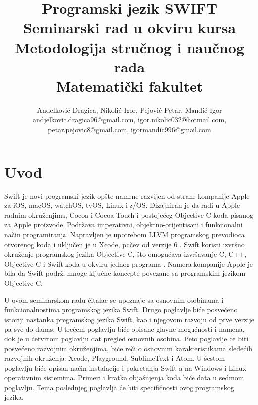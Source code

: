 \documentclass[a4paper]{article}
\begin{document}
\title{Programski jezik SWIFT\\ \small{Seminarski rad u okviru kursa\\Metodologija stručnog i naučnog rada\\ Matematički fakultet}}

\author{Anđelković Dragica, Nikolić Igor, Pejović Petar, Mandić Igor\\ andjelkovic.dragica96@gmail.com, igor.nikolic032@hotmail.com,\\ petar.pejovic8@gmail.com, igormandic996@gmail.com}


\maketitle



\tableofcontents

\newpage

\section{Uvod}
\label{sec:uvod}
Swift je novi programski jezik opšte namene razvijen od strane kompanije Apple za iOS, macOS, watchOS, tvOS, Linux i z/OS. Dizajniran je da radi u Apple radnim okruženjima, Cocoa i Cocoa Touch i postojećeg Objective-C koda pisanog za Apple proizvode. Podržava imperativni, objektno-orijentisani i funkcionalni način programiranja. Napravljen je upotrebom LLVM programskog prevodioca otvorenog koda i uključen je u Xcode, počev od verzije 6 \cite{swift_sajt}. Swift koristi izvršno okruženje programskog jezika Objective-C, što omogućava izvršavanje C, C++, Objective-C i Swift koda u okviru jednog programa \cite{arc_sajt}.
Namera kompanije Apple je bila da Swift podrži mnoge ključne koncepte povezane sa programskim jezikom Objective-C.

 U ovom seminarskom radu čitalac se upoznaje sa osnovnim osobinama i funkcionalnostima programskog jezika Swift. Drugo poglavlje biće posvećeno istoriji nastanka programskog jezika Swift, kao i njegovom razvoju od prve verzije pa sve do danas. U trećem poglavlju biće opisane glavne mogućnosti i namena, dok je u četvrtom poglavlju dat pregled osnovnih osobina. Peto poglavlje će biti posvećeno razvojnim okruženjima, biće reči o osnovnim karakteristikama sledećih razvojnih okruženja: Xcode, Playground, SublimeText i Atom. U šestom poglavlju biće opisan način instalacije i pokretanja Swift-a na Windows i Linux operativnim sistemima. Primeri i kratka objašnjenja koda biće data u sedmom poglavlju. Tema poslednjeg poglavlja će biti specifičnosti ovog programskog jezika.
\end{document}
